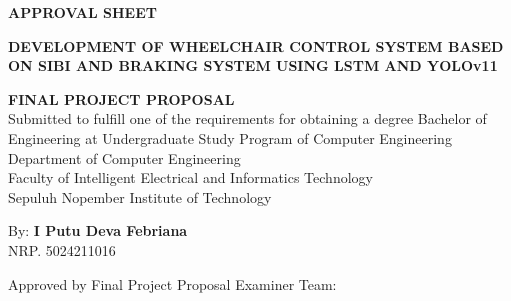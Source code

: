 \begin{center}
	\large
  \textbf{APPROVAL SHEET}
\end{center}

\thispagestyle{empty}

\begin{center}
  \textbf{DEVELOPMENT OF WHEELCHAIR CONTROL SYSTEM BASED ON SIBI AND BRAKING SYSTEM USING LSTM AND YOLOv11}
\end{center}

\begingroup
  \small

  \begin{center}
    \textbf{FINAL PROJECT PROPOSAL} \\
    Submitted to fulfill one of the requirements for obtaining a degree
    Bachelor of Engineering at 
    Undergraduate Study Program of Computer Engineering \\
    Department of Computer Engineering \\
    Faculty of Intelligent Electrical and Informatics Technology \\
    Sepuluh Nopember Institute of Technology
  \end{center}

  \begin{center}
    By: \textbf{I Putu Deva Febriana} \\
    NRP. 5024211016
  \end{center}

  \begin{center}
    Approved by Final Project Proposal Examiner Team:
  \end{center}
 \vspace{3ex}
  \begingroup
    \setlength{\tabcolsep}{0pt}

